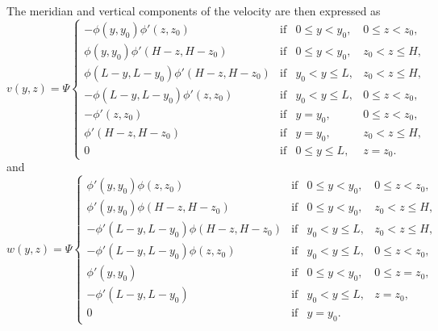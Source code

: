 The meridian and vertical components of the velocity are then expressed as
\begin{equation} \label{eq:v_overturner}
	v(y,z) = \Psi\left\{ 
		\begin{array}{lrrr}
			- \phi(y,y_0)\phi'(z,z_0) & \mbox{if} & 0 \le y < y_0, & 0 \le z < z_0,\\
			\phi(y,y_0)\phi'(H-z,H-z_0) & \mbox{if} & 0 \le y < y_0, & z_0 < z \le H,\\
			\phi(L-y,L-y_0)\phi'(H-z,H-z_0) & \mbox{if} & y_0 < y \le L, & z_0 < z \le H,\\
			- \phi(L-y,L-y_0)\phi'(z,z_0) & \mbox{if} & y_0 < y \le L, & 0 \le z < z_0,\\
			- \phi'(z,z_0) & \mbox{if} & y = y_0, & 0 \le z < z_0,\\
			\phi'(H-z,H-z_0) & \mbox{if} & y = y_0, & z_0 < z \le H,\\
			0 & \mbox{if} &0 \le y \le L, & z = z_0.
		\end{array}
	\right.
\end{equation}
and
\begin{equation} \label{eq:w_overturner}
	w(y,z) = \Psi\left\{ 
		\begin{array}{lrrr}
			\phi'(y,y_0)\phi(z,z_0) & \mbox{if} & 0 \le y < y_0, & 0 \le z < z_0,\\
			\phi'(y,y_0)\phi(H-z,H-z_0) & \mbox{if} & 0 \le y < y_0, & z_0 < z \le H,\\
			- \phi'(L-y,L-y_0)\phi(H-z,H-z_0) & \mbox{if} & y_0 < y \le L, & z_0 < z \le H,\\
			- \phi'(L-y,L-y_0)\phi(z,z_0) & \mbox{if} & y_0 < y \le L, & 0 \le z < z_0,\\
			\phi'(y,y_0) & \mbox{if} & 0 \le y < y_0, & 0 \le z = z_0,\\
			- \phi'(L-y,L-y_0) & \mbox{if} & y_0 < y \le L, & z = z_0,\\
			0 & \mbox{if} & y = y_0. &
		\end{array}
	\right.
\end{equation}

